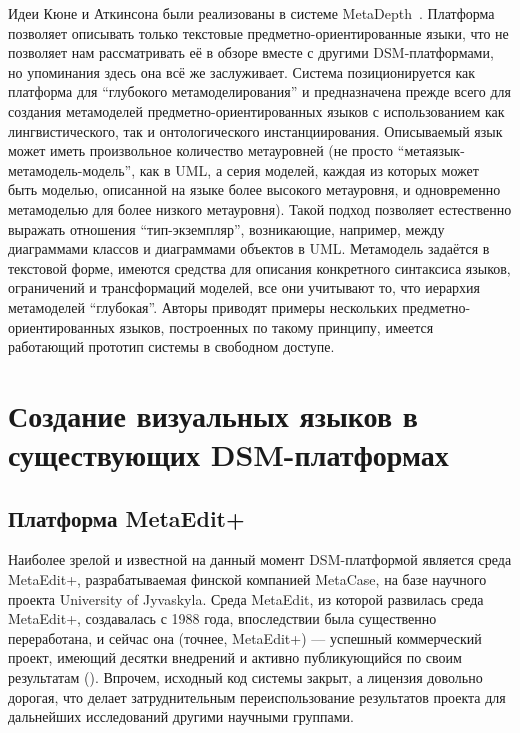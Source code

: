 Идеи Кюне и Аткинсона были реализованы в системе MetaDepth~\cite{de2010deep, de2012domain}. Платформа позволяет описывать
только текстовые предметно-ориентированные языки, что не позволяет нам рассматривать её в обзоре вместе с другими DSM-платформами,
но упоминания здесь она всё же заслуживает. Система позиционируется как платформа для "`глубокого метамоделирования"'
и предназначена прежде всего для создания метамоделей предметно-ориентированных языков с использованием как лингвистического,
так и онтологического инстанциирования. Описываемый язык может иметь произвольное количество метауровней 
(не просто "`метаязык-метамодель-модель"', как в UML, а серия моделей, каждая из которых может быть
моделью, описанной на языке более высокого метауровня, и одновременно метамоделью для более низкого метауровня). Такой
подход позволяет естественно выражать отношения "`тип-экземпляр"', возникающие, например, между диаграммами 
классов и диаграммами объектов в UML. Метамодель задаётся в текстовой форме, имеются средства для описания
конкретного синтаксиса языков, ограничений и трансформаций моделей, все они учитывают то, что иерархия метамоделей "`глубокая"'. 
Авторы приводят примеры нескольких предметно-ориентированных языков, построенных по такому принципу, имеется 
работающий прототип системы в свободном доступе.

\section{Создание визуальных языков в существующих DSM-платформах}
\subsection{Платформа MetaEdit+}
Наиболее зрелой и известной на данный момент DSM-платформой является среда MetaEdit+, 
разрабатываемая финской компанией MetaCase, на базе научного проекта University of Jyvaskyla. 
Среда MetaEdit, из которой развилась среда MetaEdit+, создавалась с 1988 года, впоследствии 
была существенно переработана, и сейчас она (точнее, MetaEdit+) --- успешный коммерческий проект, 
имеющий десятки внедрений и активно публикующийся по своим результатам (\cite{kelly2008domain, luoma2004defining, tolvanen2007advanced, tolvanen2009metaedit}). 
Впрочем, исходный код системы закрыт, а лицензия довольно дорогая, что делает затруднительным 
переиспользование результатов проекта для дальнейших исследований другими научными группами.

